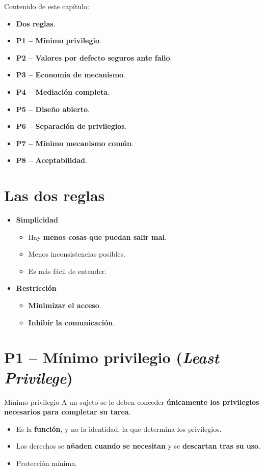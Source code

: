 \documentclass[11pt,a4paper]{report}
\begin{document}
Contenido de este capítulo:
\begin{itemize}
  \item \textbf{Dos reglas}.
  \item \textbf{P1 -- Mínimo privilegio}.
  \item \textbf{P2 -- Valores por defecto seguros ante fallo}.
  \item \textbf{P3 -- Economía de mecanismo}.
  \item \textbf{P4 -- Mediación completa}.
  \item \textbf{P5 -- Diseño abierto}.
  \item \textbf{P6 -- Separación de privilegios}.
  \item \textbf{P7 -- Mínimo mecanismo común}.
  \item \textbf{P8 -- Aceptabilidad}.
\end{itemize}

\section{Las dos reglas}

\begin{importante}
\begin{itemize}
  \item \textbf{Simplicidad}
    \begin{itemize}
      \item Hay \textbf{menos cosas que puedan salir mal}.
      \item Menos inconsistencias posibles.
      \item Es más fácil de entender.
    \end{itemize}
  \item \textbf{Restricción}
    \begin{itemize}
      \item \textbf{Minimizar el acceso}.
      \item \textbf{Inhibir la comunicación}.
    \end{itemize}
\end{itemize}
\end{importante}

\section{P1 -- Mínimo privilegio (\emph{Least Privilege})}

\begin{definicion}{Mínimo privilegio}
A un sujeto se le deben conceder \textbf{únicamente los privilegios necesarios para completar su tarea}.
\end{definicion}
\begin{itemize}
  \item Es la \textbf{función}, y no la identidad, la que determina los privilegios.
  \item Los derechos se \textbf{añaden cuando se necesitan} y se \textbf{descartan tras su uso}.
  \item Protección mínima.
\end{itemize}
\end{document}
